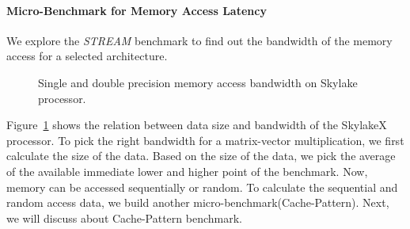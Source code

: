 \documentclass[conference, 10ppt]{IEEEtran}
\begin{document}
\paragraph{Micro-Benchmark for Memory Access Latency}
We explore the \textit{STREAM} benchmark to find out the bandwidth of the memory access for a selected architecture.
\begin{figure}[hbt!]
	\centering
	\caption{Single and double precision memory access bandwidth on Skylake processor.}
	\label{fig:stream-copy-bandwidth}
\end{figure}
Figure~\ref{fig:stream-copy-bandwidth} shows the relation between data size and bandwidth of the SkylakeX processor. 
To pick the right bandwidth for a matrix-vector multiplication, we first calculate the size of the data. Based on the size 
of the data, we pick the average of the available immediate lower and higher point of the benchmark. Now, memory can 
be accessed sequentially or random. To calculate the sequential and random access data, we build another micro-benchmark(Cache-Pattern). 
Next, we will discuss about Cache-Pattern benchmark.
 
\end{document}
